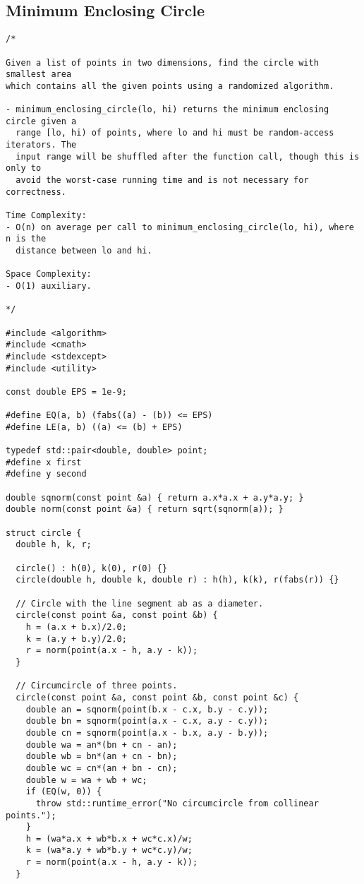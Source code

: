 \subsection{Minimum Enclosing Circle}
\begin{lstlisting}
/*

Given a list of points in two dimensions, find the circle with smallest area
which contains all the given points using a randomized algorithm.

- minimum_enclosing_circle(lo, hi) returns the minimum enclosing circle given a
  range [lo, hi) of points, where lo and hi must be random-access iterators. The
  input range will be shuffled after the function call, though this is only to
  avoid the worst-case running time and is not necessary for correctness.

Time Complexity:
- O(n) on average per call to minimum_enclosing_circle(lo, hi), where n is the
  distance between lo and hi.

Space Complexity:
- O(1) auxiliary.

*/

#include <algorithm>
#include <cmath>
#include <stdexcept>
#include <utility>

const double EPS = 1e-9;

#define EQ(a, b) (fabs((a) - (b)) <= EPS)
#define LE(a, b) ((a) <= (b) + EPS)

typedef std::pair<double, double> point;
#define x first
#define y second

double sqnorm(const point &a) { return a.x*a.x + a.y*a.y; }
double norm(const point &a) { return sqrt(sqnorm(a)); }

struct circle {
  double h, k, r;

  circle() : h(0), k(0), r(0) {}
  circle(double h, double k, double r) : h(h), k(k), r(fabs(r)) {}

  // Circle with the line segment ab as a diameter.
  circle(const point &a, const point &b) {
    h = (a.x + b.x)/2.0;
    k = (a.y + b.y)/2.0;
    r = norm(point(a.x - h, a.y - k));
  }

  // Circumcircle of three points.
  circle(const point &a, const point &b, const point &c) {
    double an = sqnorm(point(b.x - c.x, b.y - c.y));
    double bn = sqnorm(point(a.x - c.x, a.y - c.y));
    double cn = sqnorm(point(a.x - b.x, a.y - b.y));
    double wa = an*(bn + cn - an);
    double wb = bn*(an + cn - bn);
    double wc = cn*(an + bn - cn);
    double w = wa + wb + wc;
    if (EQ(w, 0)) {
      throw std::runtime_error("No circumcircle from collinear points.");
    }
    h = (wa*a.x + wb*b.x + wc*c.x)/w;
    k = (wa*a.y + wb*b.y + wc*c.y)/w;
    r = norm(point(a.x - h, a.y - k));
  }


\end{lstlisting}
